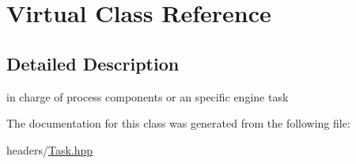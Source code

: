 \hypertarget{class_virtual}{}\section{Virtual Class Reference}
\label{class_virtual}


\subsection{Detailed Description}
in charge of process components or an specific engine task 

The documentation for this class was generated from the following file\+:\begin{DoxyCompactItemize}
\item 
headers/\mbox{\hyperlink{_task_8hpp}{Task.\+hpp}}\end{DoxyCompactItemize}
